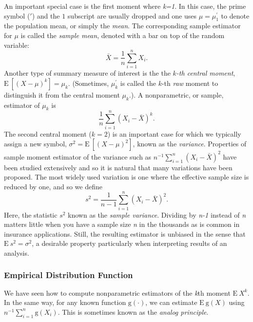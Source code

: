 \documentclass[]{book}
\theoremstyle{definition}
\theoremstyle{definition}
\theoremstyle{definition}
\theoremstyle{remark}
\begin{document}
An important special case is the first moment where \emph{k=1}. In this
case, the prime symbol (\(\prime\)) and the \(1\) subscript are usually
dropped and one uses \(\mu=\mu^{\prime}_1\) to denote the population
mean, or simply the \emph{mean}. The corresponding sample estimator for
\(\mu\) is called the \emph{sample mean}, denoted with a bar on top of
the random variable: \[
\bar{X} =\frac{1}{n} \sum_{i=1}^n X_i .
\] Another type of summary measure of interest is the the \(k\)\emph{-th
central moment}, \(\mathrm{E~} [(X-\mu)^k] = \mu_k\). (Sometimes,
\(\mu^{\prime}_k\) is called the \(k\)-th \emph{raw} moment to
distinguish it from the central moment \(\mu_k\).). A nonparametric, or
sample, estimator of \(\mu_k\) is \[
\frac{1}{n} \sum_{i=1}^n \left(X_i - \bar{X}\right)^k .
\] The second central moment (\(k=2\)) is an important case for which we
typically assign a new symbol, \(\sigma^2 = \mathrm{E~} [(X-\mu)^2]\),
known as the \emph{variance}. Properties of sample moment estimator of
the variance such as \(n^{-1}\sum_{i=1}^n \left(X_i - \bar{X}\right)^2\)
have been studied extensively and so it is natural that many variations
have been proposed. The most widely used variation is one where the
effective sample size is reduced by one, and so we define \[
s^2 = \frac{1}{n-1} \sum_{i=1}^n \left(X_i - \bar{X}\right)^2.
\] Here, the statistic \(s^2\) known as the \emph{sample variance}.
Dividing by \emph{n-1} instead of \emph{n} matters little when you have
a sample size \emph{n} in the thousands as is common in insurance
applications. Still, the resulting estimator is unbiased in the sense
that \(\mathrm{E~} s^2 = \sigma^2\), a desirable property particularly
when interpreting results of an analysis.

\subsubsection{Empirical Distribution
Function}\label{empirical-distribution-function}

We have seen how to compute nonparametric estimators of the \emph{k}th
moment \(\mathrm{E~} X^k\). In the same way, for any known function
\(\mathrm{g}(\cdot)\), we can estimate \(\mathrm{E~} \mathrm{g}(X)\)
using \(n^{-1}\sum_{i=1}^n \mathrm{g}(X_i)\). This is sometimes known as
the \emph{analog principle}.
\end{document}
